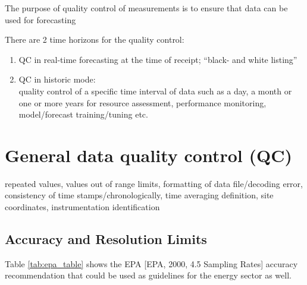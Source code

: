 The purpose of quality control of measurements is to ensure that data can be used for forecasting 

There are 2 time horizons for the quality control: 
\begin{enumerate}
    \item QC in real-time forecasting at the time of receipt; ``black- and white listing''
    \item QC in historic mode: \\ quality control of a specific time interval of data such as a day, a month or one or more years for resource assessment, performance monitoring, model/forecast training/tuning etc. 
\end{enumerate}
{\color{blue}{comment SW 210715: Why should we define that real time QC is a black and white listing? One could also imagine another category of suspicious data that is used but assuming a higher uncertainty than normal so that it influences the forecasts less. At this point I wouldn't exclude such an option.}}
{\color{green}{comment COM 210726: Agree, but it needs to be specified more here. E.g. that in extreme events, suspicious data often show the real happening. Today, I think this is not practices very much to keep algorithms robust, but we should mention that the optimal use is to include the uncertainty...}}



\section{General data quality control (QC)}
repeated values, values out of range limits, formatting of data file/decoding error, consistency of time stamps/chronologically, time averaging definition, site coordinates, instrumentation identification

\subsection{Accuracy and Resolution Limits}
Table \ref{tab:epa_table} shows the EPA [EPA, 2000, 4.5 Sampling Rates] accuracy recommendation that could be used as guidelines for the energy sector as well. 

